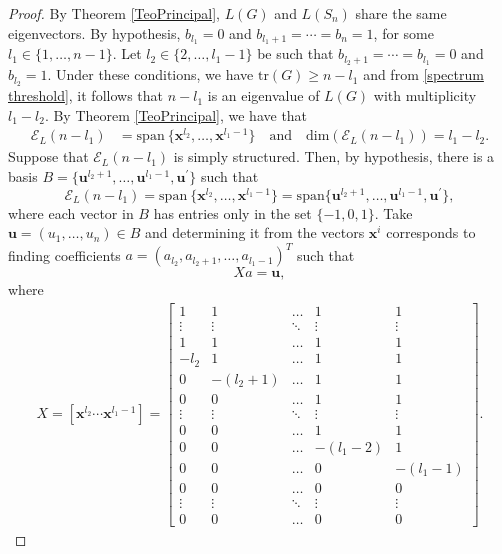 \documentclass[preprint]{elsarticle}
\begin{document}
\begin{proof}
By Theorem \ref{TeoPrincipal}, $L(G)$ and $L(S_n)$ share the same eigenvectors. By hypothesis,  $b_{l_1}=0$ and $b_{l_1+1}=\cdots=b_{n}=1$, for some $l_1 \in \{1, \ldots, n-1\}$. Let $l_2 \in \{2, \ldots,l_1-1\}$ be such that $b_{l_2+1}=\cdots=b_{l_1}=0$ and $b_{l_2}=1$. Under these conditions, we have $\text{tr}(G)\geq n-l_1$ and from \eqref{spectrum  threshold}, it follows that $n-l_1$ is an eigenvalue of $L(G)$ with multiplicity $l_1-l_2$. By Theorem \ref{TeoPrincipal}, we have that  
\begin{align*}
    \mathcal{E}_L(n-l_1)&=\mathrm{span} \ \{ \mathbf{x}^{l_2}, \ldots, \mathbf{x}^{l_1-1} \} \quad  \textrm{and} \quad \mathrm{dim}(\mathcal{E}_{L}(n-l_1)) = l_1-l_2.
\end{align*} 
Suppose that $\mathcal{E}_L(n-l_1)$ is simply structured. Then, by hypothesis, there is a basis $B=\{\mathbf{u}^{l_2+1}, \ldots, \mathbf{u}^{l_1-1}, \mathbf{u}^{\prime}\}$ such that 
$$\mathcal{E}_L(n-l_1)=\mathrm{span} \ \{ \mathbf{x}^{l_2}, \ldots, \mathbf{x}^{l_1-1} \} = \mathrm{span}\{\mathbf{u}^{l_2+1}, \ldots, \mathbf{u}^{l_1-1},\mathbf{u}^{\prime}\},$$
where each vector in $B$ has entries only in the set $\{-1,0,1\}$.
Take $\mathbf{u}=(u_{1}, \ldots, u_{n}) \in B$ and determining it from the vectors $\mathbf{x}^{i}$ corresponds to finding coefficients $a=(a_{l_2}, a_{l_2+1}, \ldots, a_{l_1-1})^{T}$ such that 
\begin{equation}\label{eq:sistemalinear(n-k)}
    X a = \mathbf{u},
\end{equation}
where 
\begin{align*}
    X=[\mathbf{x}^{l_2}\cdots\mathbf{x}^{l_1-1}]=\left[\begin{array}{ccccc}
        1          & 1            & \ldots      & 1           & 1 \\ 
        \vdots     & \vdots       & \ddots      & \vdots      & \vdots \\ 
        1          & 1            & \ldots      & 1           & 1 \\
        -l_2         & 1            & \ldots      & 1           & 1 \\ 
        0          & -(l_2+1)       & \ldots      & 1           & 1 \\ 
        0          & 0            & \ldots      & 1           & 1 \\
        \vdots     & \vdots       & \ddots      & \vdots      & \vdots \\ 
        0          & 0            & \ldots      & 1           & 1 \\ 
        0          & 0            & \ldots      & -(l_1-2)    & 1 \\ 
        0          & 0            & \ldots      & 0           & -(l_1-1) \\
        0          & 0            & \ldots      & 0           & 0 \\ 
        \vdots     & \vdots       & \ddots      & \vdots      & \vdots \\ 
        0          & 0            & \ldots      & 0           & 0  
    \end{array}\right]. 
\end{align*}


\end{proof}
\end{document}
